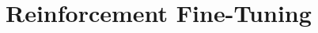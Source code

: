 \setcounter{chapter}{16}

\hypertarget{reinforcement-fine-tuning}{%
\chapter{Reinforcement Fine-Tuning}\label{reinforcement-fine-tuning}}
